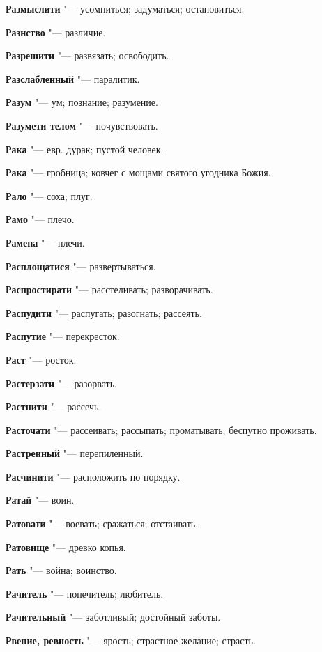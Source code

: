 \begin{mymulticols}
\noindent\textbf{Размыслити} "--- усомниться; задуматься; остановиться. 

\noindent\textbf{Разнство} "--- различие. 

\noindent\textbf{Разрешити} "--- развязать; освободить. 

\noindent\textbf{Разслабленный} "--- паралитик. 

\noindent\textbf{Разум} "--- ум; познание; разумение. 

\noindent\textbf{Разумети телом} "--- почувствовать. 

\noindent\textbf{Рака} "--- евр. дурак; пустой человек. 

\noindent\textbf{Рака} "--- гробница; ковчег с мощами святого угодника Божия. 

\noindent\textbf{Рало} "--- соха; плуг. 

\noindent\textbf{Рамо} "--- плечо. 

\noindent\textbf{Рамена} "--- плечи. 

\noindent\textbf{Расплощатися} "--- развертываться. 

\noindent\textbf{Распростирати} "--- расстеливать; разворачивать. 

\noindent\textbf{Распудити} "--- распугать; разогнать; рассеять. 

\noindent\textbf{Распутие} "--- перекресток. 

\noindent\textbf{Раст} "--- росток. 

\noindent\textbf{Растерзати} "--- разорвать. 

\noindent\textbf{Растнити} "--- рассечь. 

\noindent\textbf{Расточати} "--- рассеивать; рассыпать; проматывать; беспутно проживать. 

\noindent\textbf{Растренный} "--- перепиленный. 

\noindent\textbf{Расчинити} "--- расположить по порядку. 

\noindent\textbf{Ратай} "--- воин. 

\noindent\textbf{Ратовати} "--- воевать; сражаться; отстаивать. 

\noindent\textbf{Ратовище} "--- древко копья. 

\noindent\textbf{Рать} "--- война; воинство. 

\noindent\textbf{Рачитель} "--- попечитель; любитель. 

\noindent\textbf{Рачительный} "--- заботливый; достойный заботы. 

\noindent\textbf{Рвение, ревность} "--- ярость; страстное желание; страсть. 


\end{mymulticols}
